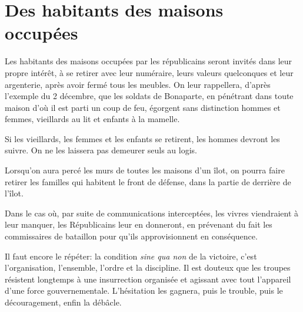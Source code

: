 \documentclass[french,twoside]{book} %
\newif\ifdev
\renewcommand{\LettrineFontHook}{\color{rubric}}
\newcommand{\initialiv}[2]{%
  \let\oldLFH\LettrineFontHook
  \IfSubStr{QJ’}{#1}{
    \lettrine[lines=4, lhang=0.2, loversize=-0.1, lraise=0.2]{\smash{#1}}{#2}
  }{\IfSubStr{É}{#1}{
    \lettrine[lines=4, lhang=0.2, loversize=-0, lraise=0]{\smash{#1}}{#2}
  }{\IfSubStr{ÀÂ}{#1}{
    \lettrine[lines=4, lhang=0.2, loversize=-0, lraise=0, slope=0.6em]{\smash{#1}}{#2}
  }{\IfSubStr{A}{#1}{
    \lettrine[lines=4, lhang=0.2, loversize=0.2, slope=0.6em]{\smash{#1}}{#2}
  }{\IfSubStr{V}{#1}{
    \lettrine[lines=4, lhang=0.2, loversize=0.2, slope=-0.5em]{\smash{#1}}{#2}
  }{
    \lettrine[lines=4, lhang=0.2, loversize=0.2]{\smash{#1}}{#2}
  }}}}}
  \let\LettrineFontHook\oldLFH
}
\renewcommand{\LettrineFontHook}{\bfseries\color{rubric}}
\begin{document}
\section[{Des habitants des maisons occupées}]{Des habitants des maisons occupées}\renewcommand{\leftmark}{Des habitants des maisons occupées}

\noindent Les habitants des maisons occupées par les républicains seront invités dans leur propre intérêt, à se retirer avec leur numéraire, leurs valeurs quelconques et leur argenterie, après avoir fermé tous les meubles. On leur rappellera, d’après l’exemple du 2 décembre, que les soldats de Bonaparte, en pénétrant dans toute maison d’où il est parti un coup de feu, égorgent sans distinction hommes et femmes, vieillards au lit et enfants à la mamelle.\par
Si les vieillards, les femmes et les enfants se retirent, les hommes devront les suivre. On ne les laissera pas demeurer seuls au logis.\par
Lorsqu’on aura percé les murs de toutes les maisons d’un îlot, on pourra faire retirer les familles qui habitent le front de défense, dans la partie de derrière de l’îlot.\par
Dans le cas où, par suite de communications interceptées, les vivres viendraient à leur manquer, les Républicains leur en donneront, en prévenant du fait les commissaires de bataillon pour qu’ils approvisionnent en conséquence.\par
Il faut encore le répéter: la condition \emph{sine qua non} de la victoire, c’est l’organisation, l’ensemble, l’ordre et la discipline. Il est douteux que les troupes résistent longtemps à une insurrection organisée et agissant avec tout l’appareil d’une force gouvernementale. L'hésitation les gagnera, puis le trouble, puis le découragement, enfin la débâcle.
 


\ifbooklet
  \newpage\null\thispagestyle{empty}\newpage
\fi

\ifdev %
\fontname\font — \textsc{Les règles du jeu}\par
(\hyperref[utopie]{\underline{Lien}})\par
\noindent \initialiv{A}{lors là}\blindtext\par
\noindent \initialiv{À}{ la bonheur des dames}\blindtext\par
\noindent \initialiv{É}{tonnez-le}\blindtext\par
\noindent \initialiv{Q}{ualitativement}\blindtext\par
\noindent \initialiv{V}{aloriser}\blindtext\par
\Blindtext
\phantomsection
\label{utopie}
\Blinddocument
\fi
\end{document}
